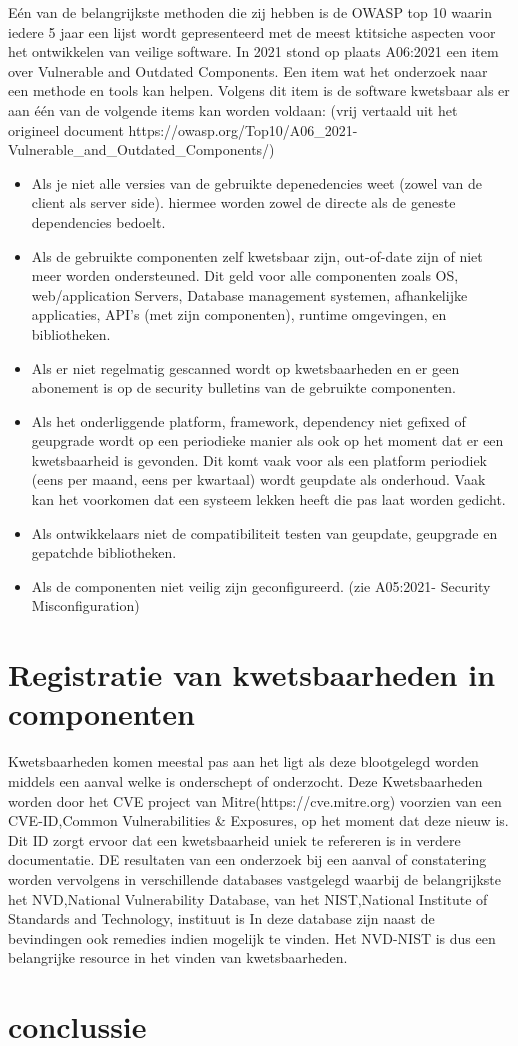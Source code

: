 Eén van de belangrijkste methoden die zij hebben is de OWASP top 10 waarin iedere 5 jaar een lijst wordt gepresenteerd met de meest ktitsiche aspecten voor het ontwikkelen van veilige software. In 2021 stond op plaats A06:2021 een item over Vulnerable and Outdated Components. Een item wat het onderzoek naar een methode en tools kan helpen. Volgens dit item is de software kwetsbaar als er aan één van de volgende items kan worden voldaan: (vrij vertaald uit het origineel document https://owasp.org/Top10/A06\_2021-Vulnerable\_and\_Outdated\_Components/)
\begin{itemize}
    \item Als je niet alle versies van de gebruikte depenedencies weet (zowel van de client als server side). hiermee worden zowel de directe als de geneste dependencies bedoelt.
    \item Als de gebruikte componenten zelf kwetsbaar zijn, out-of-date zijn of niet meer worden ondersteuned. Dit geld voor alle componenten zoals OS, web/application Servers, Database management systemen, afhankelijke applicaties, API's (met zijn componenten), runtime omgevingen, en bibliotheken.
    \item Als er niet regelmatig gescanned wordt op kwetsbaarheden en er geen abonement is op de security bulletins van de gebruikte componenten.
    \item Als het onderliggende platform, framework, dependency niet gefixed of geupgrade wordt op een periodieke manier als ook op het moment dat er een kwetsbaarheid is gevonden. Dit komt vaak voor als een platform periodiek (eens per maand, eens per kwartaal) wordt geupdate als onderhoud. Vaak kan het voorkomen dat een systeem lekken heeft die pas laat worden gedicht.
    \item Als ontwikkelaars niet de compatibiliteit testen van geupdate, geupgrade en gepatchde bibliotheken.
    \item Als de componenten niet veilig zijn geconfigureerd. (zie A05:2021- Security Misconfiguration)
\end{itemize}

\section{Registratie van kwetsbaarheden in componenten}\label{sec:registratie-van-kwetsbaarheden-in-bibliotheken}
Kwetsbaarheden komen meestal pas aan het ligt als deze blootgelegd worden middels een aanval welke is onderschept of onderzocht. Deze Kwetsbaarheden worden door het CVE project van Mitre(https://cve.mitre.org) voorzien van een CVE-ID,Common Vulnerabilities & Exposures, op het moment dat deze nieuw is. Dit ID zorgt ervoor dat een kwetsbaarheid uniek te refereren is in verdere documentatie. DE resultaten van een onderzoek bij een aanval of constatering worden vervolgens in verschillende databases vastgelegd waarbij de belangrijkste het NVD,National Vulnerability Database,  van het NIST,National Institute of Standards and Technology, instituut is
In deze database zijn naast de bevindingen ook remedies indien mogelijk te vinden. Het NVD-NIST is dus een belangrijke resource in het vinden van kwetsbaarheden.



\section{conclussie}\label{sec:conclussie}
